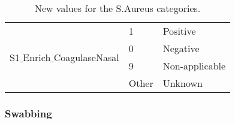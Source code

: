 \begin{table}[H]
\begin{tabular}{l | l | l}
            \multirow{4}{*}{S1$\_$Enrich$\_$CoagulaseNasal} 
                                         & \multicolumn{1}{l}{1}     & \multicolumn{1}{l}{Positive}       \\\cline{2-3}
                                         & \multicolumn{1}{l}{0}     & \multicolumn{1}{l}{Negative}       \\\cline{2-3}
                                         & \multicolumn{1}{l}{9}     & \multicolumn{1}{l}{Non-applicable} \\\cline{2-3}
                                         & \multicolumn{1}{l}{Other} & \multicolumn{1}{l}{Unknown}        \\\hline

        \end{tabular}

    \caption{New values for the S.Aureus categories.}

\end{table}

\subsubsection{Swabbing}

